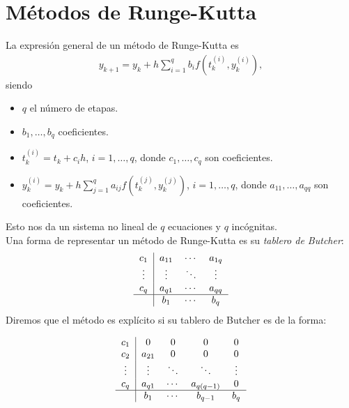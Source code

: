 \section{Métodos de Runge-Kutta}
\noindent La expresión general de un método de Runge-Kutta es
\begin{align*}
    \boxed{
    y_{k+1} = y_k + h \sum_{i=1}^{q} b_i f\left(t_k^{(i)},y_k^{(i)}\right),
    }
\end{align*}
siendo
\begin{itemize}
    \item $q$ el número de etapas.
    \item $b_1,\ldots,b_q$ coeficientes.
    \item $t_k^{(i)} = t_k + c_ih$, $i = 1,\ldots,q$, donde $c_1,\ldots,c_q$ son coeficientes.
    \item $y_k^{(i)} = y_k + h\sum_{j=1}^{q} a_{ij}f\left( t_k^{(j)},y_k^{(j)} \right)$, $i = 1,\ldots,q$, donde $a_{11},\ldots,a_{qq}$ son coeficientes. 
\end{itemize}
Esto nos da un sistema no lineal de $q$ ecuaciones y $q$ incógnitas.
\\
\newline
Una forma de representar un método de Runge-Kutta es su \textit{tablero de Butcher}:
\begin{align*}
\begin{tabular}{c|ccc}
$c_1$    & $a_{11}$ & $\cdots$ & $a_{1q}$ \\
$\vdots$ & $\vdots$ & $\ddots$ & $\vdots$ \\
$c_q$    & $a_{q1}$ & $\cdots$ & $a_{qq}$ \\ \hline
       & $b_1$    & $\cdots$ & $b_q$
\end{tabular}
\end{align*}
Diremos que el método es explícito si su tablero de Butcher es de la forma:

\begin{align*}
\begin{tabular}{c|cccc}
$c_1$    & 0      & 0        & 0            & 0    \\
$c_2$    & $a_{21}$ &    0   &    0        & 0    \\
$\vdots$ & $\vdots$ & $\ddots$ & $\ddots$         & $\vdots$    \\
$c_{q}$  & $a_{q1}$ & $\cdots$ & $a_{q(q-1)}$ & 0    \\ \hline
       & $b_1 $   & $\cdots$ &$ b_{q-1}$    & $b_q$
\end{tabular}
\end{align*}

